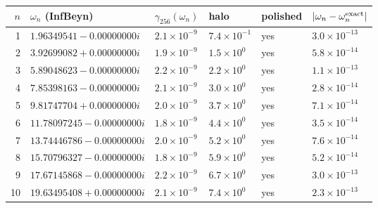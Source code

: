 \begin{tabular}{rlllll}
\toprule
$n$ & $\omega_n$ (InfBeyn) & $\gamma_{256}(\omega_n)$ & halo & polished & $|\omega_n-\omega_n^{\rm exact}|$\\
\midrule
1 & $1.96349541-0.00000000i$ & $2.1\times10^{-9}$ & $7.4\times10^{-1}$ & yes & $3.0\times10^{-13}$\\
2 & $3.92699082+0.00000000i$ & $1.9\times10^{-9}$ & $1.5\times10^{0}$ & yes & $5.8\times10^{-14}$\\
3 & $5.89048623-0.00000000i$ & $2.2\times10^{-9}$ & $2.2\times10^{0}$ & yes & $1.1\times10^{-13}$\\
4 & $7.85398163-0.00000000i$ & $2.1\times10^{-9}$ & $3.0\times10^{0}$ & yes & $2.8\times10^{-14}$\\
5 & $9.81747704+0.00000000i$ & $2.0\times10^{-9}$ & $3.7\times10^{0}$ & yes & $7.1\times10^{-14}$\\
6 & $11.78097245-0.00000000i$ & $1.8\times10^{-9}$ & $4.4\times10^{0}$ & yes & $3.5\times10^{-14}$\\
7 & $13.74446786-0.00000000i$ & $2.0\times10^{-9}$ & $5.2\times10^{0}$ & yes & $7.6\times10^{-14}$\\
8 & $15.70796327-0.00000000i$ & $1.8\times10^{-9}$ & $5.9\times10^{0}$ & yes & $5.2\times10^{-14}$\\
9 & $17.67145868-0.00000000i$ & $2.2\times10^{-9}$ & $6.7\times10^{0}$ & yes & $3.0\times10^{-13}$\\
10 & $19.63495408+0.00000000i$ & $2.1\times10^{-9}$ & $7.4\times10^{0}$ & yes & $2.3\times10^{-13}$\\
\bottomrule
\end{tabular}
